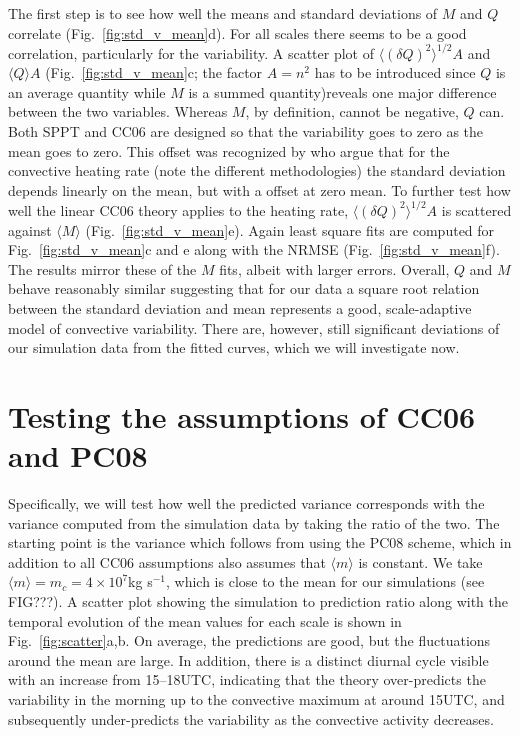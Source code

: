 \documentclass[a4paper, 12pt]{article}
\begin{document}
The first step is to see how well the means and standard deviations of $M$ and $Q$ correlate (Fig.~\ref{fig:std_v_mean}d). For all scales there seems to be a good correlation, particularly for the variability. A scatter plot of $\langle (\delta Q )^2 \rangle^{1/2} A$ and $\langle Q \rangle A$ (Fig.~\ref{fig:std_v_mean}c; the factor $A=n^2$ has to be introduced since $Q$ is an average quantity while $M$ is a summed quantity)reveals one major difference between the two variables. Whereas $M$, by definition, cannot be negative, $Q$ can. Both SPPT and CC06 are designed so that the variability goes to zero as the mean goes to zero. This offset was recognized by \cite{Shutts2007} who argue that for the convective heating rate (note the different methodologies) the standard deviation depends linearly on the mean, but with a offset at zero mean. To further test how well the linear CC06 theory applies to the heating rate, $\langle (\delta Q )^2 \rangle^{1/2} A$ is scattered against $\langle M \rangle$ (Fig.~\ref{fig:std_v_mean}e). Again least square fits are computed for Fig.~\ref{fig:std_v_mean}c and e along with the NRMSE (Fig.~\ref{fig:std_v_mean}f). The results mirror these of the $M$ fits, albeit with larger errors. Overall, $Q$ and $M$ behave reasonably similar suggesting that for our data a square root relation between the standard deviation and mean represents a good, scale-adaptive model of convective variability. There are, however, still significant deviations of our simulation data from the fitted curves, which we will investigate now. 

\section{Testing the assumptions of CC06 and PC08}
Specifically, we will test how well the predicted variance corresponds with the variance computed from the simulation data by taking the ratio of the two. The starting point is the variance which follows from using the PC08 scheme, which in addition to all CC06 assumptions also assumes that $\langle m \rangle$ is constant. We take $\langle m \rangle = m_c = 4\times10^7$kg s$^{-1}$, which is close to the mean for our simulations (see FIG???). A scatter plot showing the simulation to prediction ratio along with the temporal evolution of the mean values for each scale is shown in Fig.~\ref{fig:scatter}a,b. On average, the predictions are good, but the fluctuations around the mean are large. In addition, there is a distinct diurnal cycle visible with an increase from 15--18UTC, indicating that the theory over-predicts the variability in the morning up to the convective maximum at around 15UTC, and subsequently under-predicts the variability as the convective activity decreases. 
\end{document}
